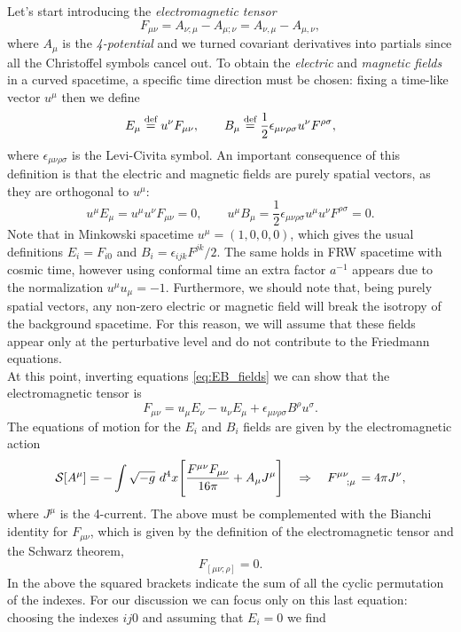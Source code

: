 Let's start introducing the \emph{electromagnetic tensor} 
$$F_{\mu\nu}= A_{\nu;\mu} -  A_{\mu;\nu}= A_{\nu,\mu} -  A_{\mu,\nu},$$
where $A_\mu$ is the \emph{4-potential} and we turned covariant derivatives into partials since all the Christoffel symbols cancel out.
To obtain the \emph{electric} and \emph{magnetic fields} in a curved spacetime, a specific time direction must be chosen: fixing a time-like vector $u^\mu$ then we define
\begin{equation}
    E_\mu\stackrel{\text{def}}{=} u^\nu F_{\mu\nu},\qquad B_\mu\stackrel{\text{def}}{=} \frac{1}{2}\epsilon_{\mu\nu\rho\sigma} u^\nu F^{\rho\sigma},\label{eq:EB_fields}
\end{equation}
where $\epsilon_{\mu\nu\rho\sigma}$ is the Levi-Civita symbol. An important consequence of this definition is that the electric and magnetic fields are purely spatial vectors, as they are orthogonal to $u^\mu$:
$$u^\mu E_\mu=u^\mu u^\nu F_{\mu\nu}=0,\qquad u^\mu B_\mu=\frac{1}{2}\epsilon_{\mu\nu\rho\sigma} u^\mu u^\nu F^{\rho\sigma}=0.$$ Note that in Minkowski spacetime $u^\mu=(1,0,0,0)$, which gives the usual definitions $E_i=F_{i0}$ and $B_i=\epsilon_{ijk}F^{jk}/2$. The same holds in FRW spacetime with cosmic time, however using conformal time an extra factor $a^{-1}$ appears due to the normalization $u^\mu u_\mu=-1$. Furthermore, we should note that, being purely spatial vectors, any non-zero electric or magnetic field will break the isotropy of the background spacetime. For this reason, we will assume that these fields appear only at the perturbative level and do not contribute to the Friedmann equations.\\
At this point, inverting equations \eqref{eq:EB_fields} we can show that the electromagnetic tensor is
\begin{equation}
    F_{\mu\nu}=u_\mu E_\nu - u_\nu E_\mu +\epsilon_{\mu\nu\rho\sigma} B^\rho u^\sigma.
\end{equation}
The equations of motion for the $E_i$ and $B_i$ fields are given by the electromagnetic action
$$\mathcal{S}[A^\mu]=-\int \sqrt{-g}\ d^4x \Bigg[\frac{F^{\mu\nu}F_{\mu\nu}}{16\pi}+A_\mu J^\mu\Bigg]\quad \Rightarrow\quad \tensor{F}{^\mu^\nu_;_\mu}=4\pi J^\nu,$$
where $J^\mu$ is the 4-current. The above must be complemented with the Bianchi identity for $F_{\mu\nu}$, which is given by the definition of the electromagnetic tensor and the Schwarz theorem, 
$$F_{[\mu\nu;\rho]}=0.$$
In the above the squared brackets indicate the sum of all the cyclic permutation of the indexes. For our discussion we can focus only on this last equation: choosing the indexes $ij0$ and assuming that $E_i=0$ we find
